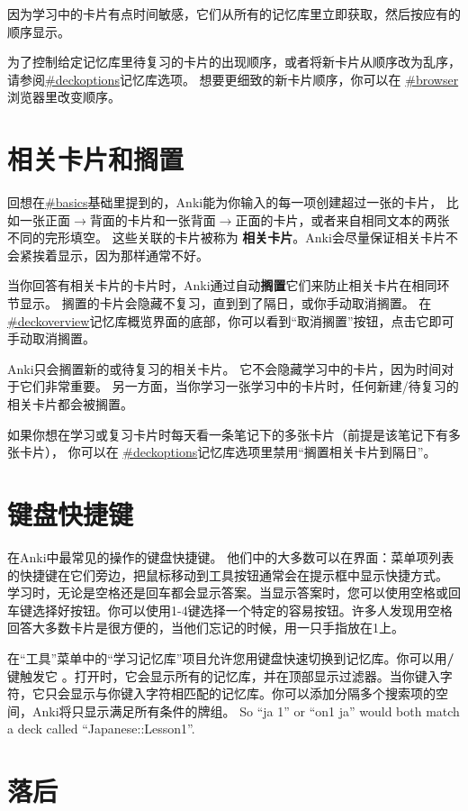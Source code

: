 \documentclass[a4paper]{book}
\begin{document}
	因为学习中的卡片有点时间敏感，它们从所有的记忆库里立即获取，然后按应有的顺序显示。
	
	为了控制给定记忆库里待复习的卡片的出现顺序，或者将新卡片从顺序改为乱序，请参阅\url{#deckoptions}记忆库选项。 想要更细致的新卡片顺序，你可以在
	\url{#browser}浏览器里改变顺序。
	\section{相关卡片和搁置}
	
	回想在\url{#basics}基础里提到的，Anki能为你输入的每一项创建超过一张的卡片， 比如一张正面$\to$背面的卡片和一张背面$\to$正面的卡片，或者来自相同文本的两张不同的完形填空。 这些关联的卡片被称为
	\textbf{相关卡片}。Anki会尽量保证相关卡片不会紧挨着显示，因为那样通常不好。
	
	当你回答有相关卡片的卡片时，Anki通过自动\textbf{搁置}它们来防止相关卡片在相同环节显示。 搁置的卡片会隐藏不复习，直到到了隔日，或你手动取消搁置。 在
	\url{#deckoverview}记忆库概览界面的底部，你可以看到“取消搁置”按钮，点击它即可手动取消搁置。
	
	Anki只会搁置新的或待复习的相关卡片。 它不会隐藏学习中的卡片，因为时间对于它们非常重要。 另一方面，当你学习一张学习中的卡片时，任何新建/待复习的相关卡片都会被搁置。
	
	如果你想在学习或复习卡片时每天看一条笔记下的多张卡片（前提是该笔记下有多张卡片）， 你可以在
	\url{#deckoptions}记忆库选项里禁用“搁置相关卡片到隔日”。
	
	\section{键盘快捷键}
	
	在Anki中最常见的操作的键盘快捷键。 他们中的大多数可以在界面：菜单项列表的快捷键在它们旁边，把鼠标移动到工具按钮通常会在提示框中显示快捷方式。
	学习时，无论是空格还是回车都会显示答案。当显示答案时，您可以使用空格或回车键选择好按钮。你可以使用1-4键选择一个特定的容易按钮。许多人发现用空格回答大多数卡片是很方便的，当他们忘记的时候，用一只手指放在1上。
	
	在“工具”菜单中的“学习记忆库”项目允许您用键盘快速切换到记忆库。你可以用\textbf{/}键触发它 。打开时，它会显示所有的记忆库，并在顶部显示过滤器。当你键入字符，它只会显示与你键入字符相匹配的记忆库。你可以添加分隔多个搜索项的空间，Anki将只显示满足所有条件的牌组。 So “ja 1” or “on1 ja” would both match a deck called
	“Japanese::Lesson1”.
	
	\section{落后}
	
\end{document}
